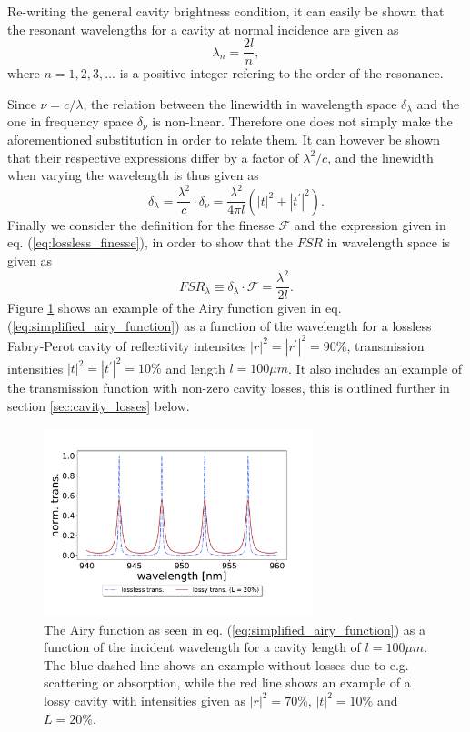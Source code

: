 Re-writing the general cavity brightness condition, it can easily be shown that the resonant wavelengths for a cavity at normal incidence are given as
\begin{equation}
    \lambda_n = \frac{2l}{n},
\end{equation}
where $n=1,2,3,...$ is a positive integer refering to the order of the resonance. 

Since $\nu = c / \lambda$, the relation between the linewidth in wavelength space $\delta_{\lambda}$ and the one in frequency space $\delta_{\nu}$ is non-linear. Therefore one does not simply make the aforementioned substitution in order to relate them. It can however be shown that their respective expressions differ by a factor of $\lambda^2/c$, and the linewidth when varying the wavelength is thus given as
\begin{equation}
    \delta_{\lambda} = \frac{\lambda^2}{c} \cdot \delta_{\nu} = \frac{\lambda^2}{4 \pi l} (|t|^2 + |t^{\prime}|^2).
\end{equation}
Finally we consider the definition for the finesse $\mathcal{F}$ and the expression given in eq. (\ref{eq:lossless_finesse}), in order to show that the $FSR$ in wavelength space is given as 
\begin{equation}
    FSR_{\lambda} \equiv \delta_{\lambda} \cdot \mathcal{F} =  \frac{\lambda^2}{2l}.
\end{equation}
Figure \ref{fig:airy_trans_vs_wavelength} shows an example of the Airy function given in eq. (\ref{eq:simplified_airy_function}) as a function of the wavelength for a lossless Fabry-Perot cavity of reflectivity intensites $|r|^2 = |r^{\prime}|^2 = 90\%$, transmission intensities $|t|^2 = |t^{\prime}|^2 = 10\%$ and length $l=100 \mu m$. It also includes an example of the transmission function with non-zero cavity losses, this is outlined further in section \ref{sec:cavity_losses} below.

\begin{figure}[h!]
    \centering
    \includegraphics[width=0.7\textwidth]{figures/airy_function_vs_wavelength.pdf}
    \caption{The Airy function as seen in eq. (\ref{eq:simplified_airy_function}) as a function of the incident wavelength for a cavity length of $l = 100 \mu m$. The blue dashed line shows an example without losses due to e.g. scattering or absorption, while the red line shows an example of a lossy cavity with intensities given as $|r|^2 = 70\%$, $|t|^2 = 10\%$ and $L = 20\%$.}
    \label{fig:airy_trans_vs_wavelength}
\end{figure}

